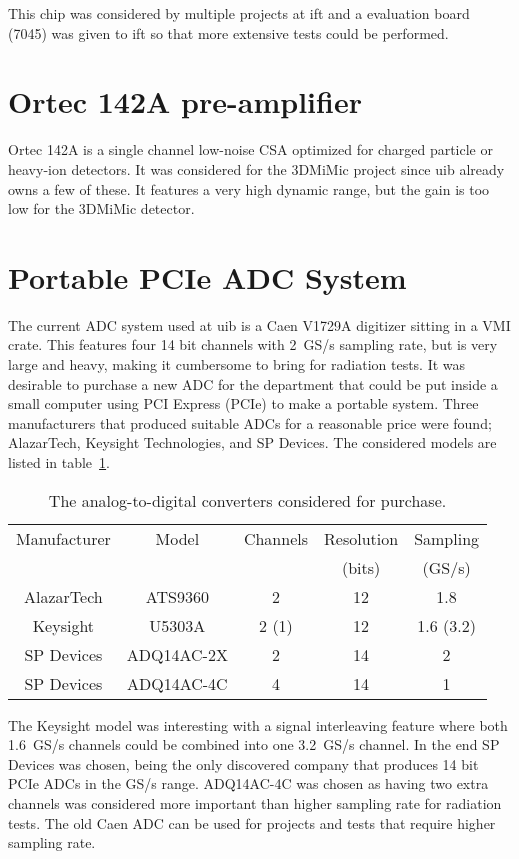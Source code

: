 \documentclass[../main/thesis.tex]{subfiles}
\begin{document}
This chip was considered by multiple projects at \gls{ift} and a evaluation board (7045) was given to \gls{ift} so that more extensive tests could be performed. 

\section{Ortec 142A pre-amplifier}
\label{e-ortec}
Ortec 142A is a single channel low-noise \gls{CSA} optimized for charged particle or heavy-ion detectors. It was considered for the 3DMiMic project since \gls{uib} already owns a few of these. It features a very high dynamic range, but the gain is too low for the 3DMiMic detector. 

\section{Portable PCIe ADC System}
\label{e-adc}
The current \gls{ADC} system used at \gls{uib} is a Caen V1729A digitizer sitting in a VMI crate. This features four 14 bit channels with 2~GS/s sampling rate, but is very large and heavy, making it cumbersome to bring for radiation tests. It was desirable to purchase a new \gls{ADC} for the department that could be put inside a small computer using PCI Express (PCIe) to make a portable system. Three manufacturers that produced suitable \gls{ADC}s for a reasonable price were found; AlazarTech, Keysight Technologies, and SP Devices. The considered models are listed in table~\ref{tab-adc}. 

\begin{table}[h]
\begin{center}
	\caption{The analog-to-digital converters considered for purchase.}
	\label{tab-adc}
	\begin{tabular}{| c | c | c | c | c |}
		\hline
		Manufacturer & Model & Channels & Resolution & Sampling \\ 
		 & & & (bits) & (GS/s) \\ \hline
		AlazarTech & ATS9360 & 2 & 12 & 1.8 \\ \hline
		Keysight & U5303A & 2 (1) & 12 & 1.6 (3.2) \\ \hline
		SP Devices & ADQ14AC-2X & 2 & 14 & 2 \\ \hline
		SP Devices & ADQ14AC-4C & 4 & 14 & 1 \\ \hline
	\end{tabular}
\end{center}
\end{table}

The Keysight model was interesting with a signal interleaving feature where both 1.6~GS/s channels could be combined into one 3.2~GS/s channel. In the end SP Devices was chosen, being the only discovered company that produces 14 bit PCIe \gls{ADC}s in the GS/s range. ADQ14AC-4C was chosen as having two extra channels was considered more important than higher sampling rate for radiation tests. The old Caen \gls{ADC} can be used for projects and tests that require higher sampling rate. 
\end{document}
